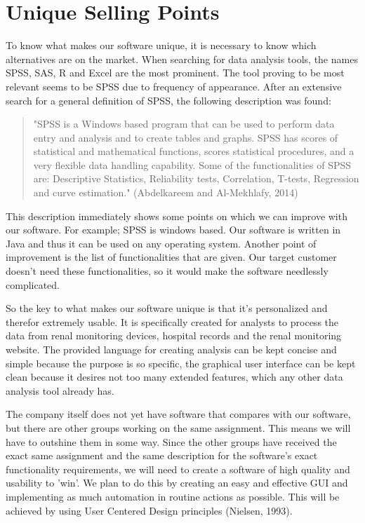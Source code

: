 \documentclass[a4paper]{article}
\begin{document}
\section{Unique Selling Points}
To know what makes our software unique, it is necessary to know which alternatives are on the market. When searching for data analysis tools, the names SPSS, SAS, R and Excel are the most prominent. The tool proving to be most relevant seems to be SPSS due to frequency of appearance. After an extensive search for a general definition of SPSS, the following description was found: 
\begin{quotation}
"SPSS is a Windows based program that can be used to perform data entry and analysis
and to create tables and graphs. SPSS has scores of statistical and mathematical functions,
scores statistical procedures, and a very flexible data handling capability. Some of the
functionalities of SPSS are: Descriptive Statistics, Reliability tests, Correlation, T-tests,
Regression and curve estimation." (Abdelkareem and Al-Mekhlafy, 2014)
\end{quotation}
\par 
This description immediately shows some points on which we can improve with our software. For example; SPSS is windows based. Our software is written in Java and thus it can be used on any operating system. Another point of improvement is the list of functionalities that are given. Our target customer doesn't need these functionalities, so it would make the software needlessly complicated.
\par
So the key to what makes our software unique is that it's personalized and therefor extremely usable. It is specifically created for analysts to process the data from renal monitoring devices, hospital records and the renal monitoring website. The provided language for creating analysis can be kept concise and simple because the purpose is so specific, the graphical user interface can be kept clean because it desires not too many extended features, which any other data analysis tool already has. 
\par 
The company itself does not yet have software that compares with our software, but there are other groups working on the same assignment. This means we will have to outshine them in some way. Since the other groups have received the exact same assignment and the same description for the software's exact functionality requirements, we will need to create a software of high quality and usability to 'win'. We plan to do this by creating an easy and effective GUI and implementing as much automation in routine actions as possible. This will be achieved by using User Centered Design principles (Nielsen, 1993).
\end{document}
